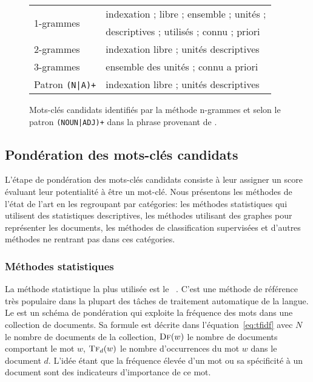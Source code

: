 \begin{figure}[!htbp]
    \centering
    \begin{tabular}{ll}
        \multirow{2}{*}{1-grammes} & indexation ; libre ; ensemble ; unités ;\\
         & descriptives ; utilisés ; connu ; priori\\
         \cmidrule(lr){1-2}
        2-grammes & indexation libre ; unités descriptives\\
         \cmidrule(lr){1-2}
        3-grammes & ensemble des unités ; connu a priori\\
         \cmidrule(lr){1-2}
        Patron \texttt{(N|A)+} & indexation libre ; unités descriptives \\
    \end{tabular}
    \caption{Mots-clés candidats identifiés par la méthode n-grammes et selon le patron \texttt{(NOUN|ADJ)+} dans la phrase  provenant de \citet{neveol_automatisation_2005}.}
    \label{fig:ex_selection}
\end{figure}



\subsection{Pondération des mots-clés candidats}\label{ponderation}
L'étape de pondération des mots-clés candidats consiste à leur assigner un score évaluant leur potentialité à être un mot-clé.
Nous présentons les méthodes de l'état de l'art en les regroupant par catégories: les méthodes statistiques qui utilisent des statistiques descriptives, les méthodes utilisant des graphes pour représenter les documents, les méthodes de classification supervisées et d'autres méthodes ne rentrant pas dans ces catégories.

\subsubsection{Méthodes statistiques}\label{statistique}

La méthode statistique la plus utilisée est le \tfidf{}~\cite{jones_statistical_1972}.
C'est une méthode de référence très populaire dans la plupart des tâches de traitement automatique de la langue. Le \tfidf{} est un schéma de pondération qui exploite la fréquence des mots dans une collection de documents.
Sa formule est décrite dans l'équation~\ref{eq:tfidf} avec $N$ le nombre de documents de la collection, $\textsc{Df}(w)$ le nombre de documents comportant le mot $w$, $\textsc{Tf}_d(w)$ le nombre d'occurrences du mot $w$ dans le document $d$.
L'idée étant que la fréquence élevée d'un mot ou sa spécificité à un document sont des indicateurs d'importance de ce mot. 

